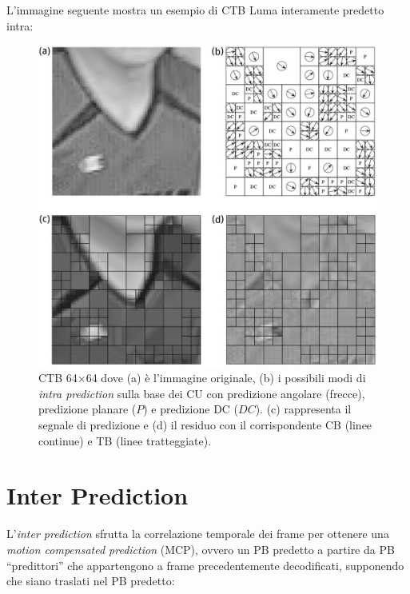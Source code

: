 L'immagine seguente mostra un esempio di CTB Luma interamente predetto intra: \\

\begin{figure}[H]
  \centering
  \captionsetup{justification=raggedright}
  \includegraphics[scale=0.5]{Figures/Intra_coding_example}
  \caption[Esempio di predizione \emph{intra}]
          {CTB 64$\times$64 dove (a) è l'immagine originale, (b) i possibili
           modi di \emph{intra prediction} sulla base dei CU con predizione
           angolare (frecce), predizione planare ($P$) e predizione DC ($DC$).
           (c) rappresenta il segnale di predizione e (d) il residuo con il
           corrispondente CB (linee continue) e TB (linee tratteggiate).}
\end{figure}

\section{Inter Prediction}\label{ref-inter}
L'\emph{inter prediction} sfrutta la correlazione temporale dei frame per 
ottenere una \emph{motion compensated prediction} (MCP), ovvero un PB predetto 
a partire da PB ``predittori'' che appartengono a frame precedentemente 
decodificati, supponendo che siano traslati nel PB predetto:

